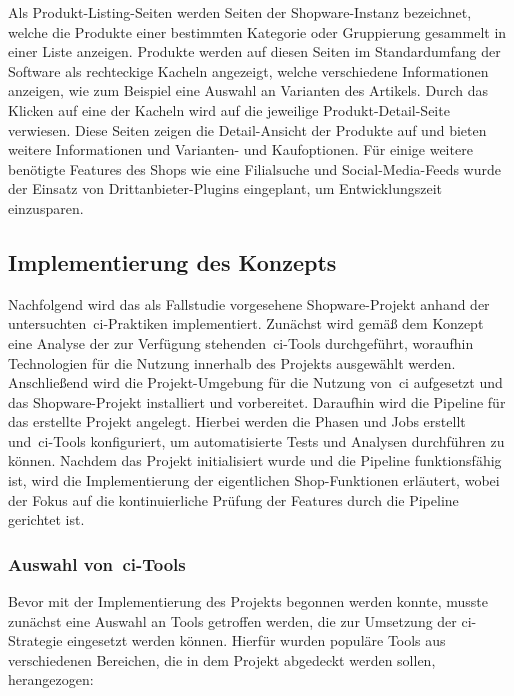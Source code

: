 Als Produkt-Listing-Seiten werden Seiten der Shopware-Instanz bezeichnet, welche die Produkte einer bestimmten
Kategorie oder Gruppierung gesammelt in einer Liste anzeigen.
Produkte werden auf diesen Seiten im Standardumfang der Software als rechteckige Kacheln angezeigt, welche
verschiedene Informationen anzeigen, wie zum Beispiel eine Auswahl an Varianten des Artikels.
Durch das Klicken auf eine der Kacheln wird auf die jeweilige Produkt-Detail-Seite verwiesen.
Diese Seiten zeigen die Detail-Ansicht der Produkte auf und bieten weitere Informationen und Varianten- und
Kaufoptionen.
Für einige weitere benötigte Features des Shops wie eine Filialsuche und Social-Media-Feeds wurde der Einsatz von
Drittanbieter-Plugins eingeplant, um Entwicklungszeit einzusparen.

\subsection{Implementierung des Konzepts} \label{subsec:04-implementation-2}

Nachfolgend wird das als Fallstudie vorgesehene Shopware-Projekt anhand der untersuchten\ \acrshort{ci}-Praktiken
implementiert.
Zunächst wird gemäß dem Konzept eine Analyse der zur Verfügung stehenden\ \acrshort{ci}-Tools durchgeführt,
woraufhin Technologien für die Nutzung innerhalb des Projekts ausgewählt werden.
Anschließend wird die Projekt-Umgebung für die Nutzung von\ \acrshort{ci} aufgesetzt und das Shopware-Projekt
installiert und vorbereitet.
Daraufhin wird die Pipeline für das erstellte Projekt angelegt.
Hierbei werden die Phasen und Jobs erstellt und\ \acrshort{ci}-Tools konfiguriert, um automatisierte Tests und Analysen
durchführen zu können.
Nachdem das Projekt initialisiert wurde und die Pipeline funktionsfähig ist, wird die Implementierung der eigentlichen
Shop-Funktionen erläutert, wobei der Fokus auf die kontinuierliche Prüfung der Features durch die Pipeline gerichtet
ist.

\subsubsection{Auswahl von\ \acrshort{ci}-Tools}

Bevor mit der Implementierung des Projekts begonnen werden konnte, musste zunächst eine Auswahl an Tools getroffen
werden, die zur Umsetzung der \acrshort{ci}-Strategie eingesetzt werden können.
Hierfür wurden populäre Tools aus verschiedenen Bereichen, die in dem Projekt abgedeckt werden sollen, herangezogen:\\

